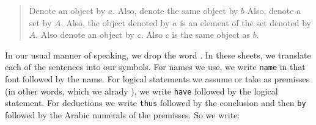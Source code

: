 \begin{quote}
Denote an object by $a$.
Also, denote the same object by $b$
Also, denote a set by $A$.
Also, the object denoted by $a$ is an element of the set denoted by $A$.
Also denote an object by $c$.
Also $c$ is the same object as $b$.
\end{quote}

In our usual manner of speaking, we drop the word .
In these sheets, we translate each of the sentences into our symbols.
For names we use, we write \texttt{name} in that font followed by the name.
For logical statements we assume or take as premisses (in other words, which we alrady ), we write \texttt{have} followed by the logical statement.
For deductions we write \texttt{thus} followed by the conclusion and then \texttt{by} followed by the Arabic numerals of the premisses.
So we write:

\begin{account}
\end{account}




